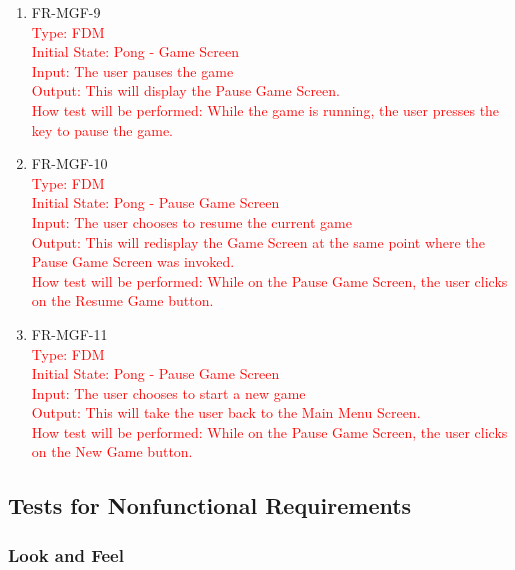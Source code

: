 \documentclass[12pt, titlepage]{article}
\begin{document}
\begin{enumerate}
\item{FR-MGF-9\\}
\textcolor{red}{Type: FDM\\
Initial State: Pong - Game Screen\\
Input: The user pauses the game\\
Output: This will display the Pause Game Screen.\\
How test will be performed: While the game is running, the user presses the key to pause the game.}\\

\item{FR-MGF-10\\}
\textcolor{red}{Type: FDM\\
Initial State: Pong - Pause Game Screen\\
Input: The user chooses to resume the current game\\
Output: This will redisplay the Game Screen at the same point where the Pause Game Screen was invoked.\\
How test will be performed: While on the Pause Game Screen, the user clicks on the Resume Game button.}\\

\item{FR-MGF-11\\}
\textcolor{red}{Type: FDM\\
Initial State: Pong - Pause Game Screen\\
Input: The user chooses to start a new game\\
Output: This will take the user back to the Main Menu Screen.\\
How test will be performed: While on the Pause Game Screen, the user clicks on the New Game button.}\\
    
\end{enumerate}

\subsection{Tests for Nonfunctional Requirements}

\subsubsection{Look and Feel}
	
\end{document}

